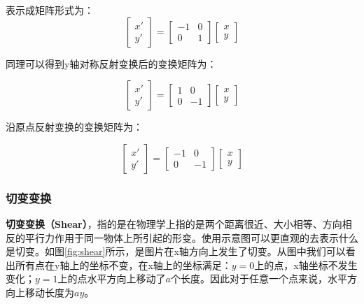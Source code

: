 \documentclass[openany]{progbookcn}
\begin{document}
表示成矩阵形式为：
\begin{equation}
	\begin{bmatrix}
	x' \\
	y'
\end{bmatrix} = \begin{bmatrix}
-1&0\\0&1\end{bmatrix}\begin{bmatrix}x\\y\end{bmatrix}
\end{equation}

同理可以得到y轴对称反射变换后的变换矩阵为：

\begin{equation}
	\begin{bmatrix}
		x' \\
		y'
	\end{bmatrix} = \begin{bmatrix}
		1&0\\0&-1\end{bmatrix}\begin{bmatrix}x\\y\end{bmatrix}
\end{equation}

沿原点反射变换的变换矩阵为：

\begin{equation}
	\begin{bmatrix}
		x' \\
		y'
	\end{bmatrix} = \begin{bmatrix}
		-1&0\\0&-1\end{bmatrix}\begin{bmatrix}x\\y\end{bmatrix}
\end{equation}

\subsubsection{切变变换}

\textbf{切变变换（Shear）}，指的是在物理学上指的是两个距离很近、大小相等、方向相反的平行力作用于同一物体上所引起的形变。使用示意图可以更直观的去表示什么是切变。如图\ref{fig:shear}所示，是图片在x轴方向上发生了切变。从图中我们可以看出所有点在y轴上的坐标不变，在x轴上的坐标满足：$y=0$上的点，x轴坐标不发生变化；$y=1$上的点水平方向上移动了$a$个长度。因此对于任意一个点来说，水平方向上移动长度为$ay$。
\end{document}
